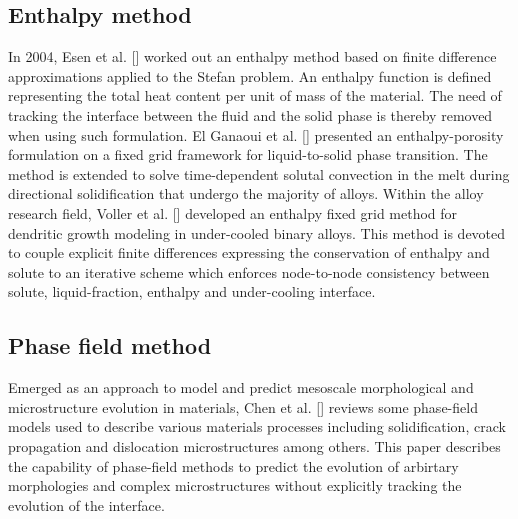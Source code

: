 \subsection{Enthalpy method}
In 2004, Esen et al. [\cite{esen_kutluay_2004}] worked out an enthalpy method based on finite difference approximations applied to the Stefan problem. An enthalpy function is defined representing the total heat content per unit of mass of the material. The need of tracking the interface between the fluid and the solid phase is thereby removed when using such formulation. El Ganaoui et al. [\cite{el ganaoui_lamazouade_bontoux_morvan_2002}] presented an enthalpy-porosity formulation on a fixed grid framework for liquid-to-solid phase transition. The method is extended to solve time-dependent solutal convection in the melt during directional solidification that undergo the majority of alloys. Within the alloy research field, Voller et al. [\cite{voller_2008}] developed an enthalpy fixed grid method for dendritic growth modeling in under-cooled binary alloys. This method is devoted to couple explicit finite differences expressing the conservation of enthalpy and solute to an iterative scheme which enforces node-to-node consistency between solute, liquid-fraction, enthalpy and under-cooling interface.
\subsection{Phase field method}
Emerged as an approach to model and predict mesoscale morphological and microstructure evolution in materials, Chen et al. [\cite{chen_2002}] reviews some phase-field models used to describe various materials processes including solidification, crack propagation and dislocation microstructures among others. This paper describes the capability of phase-field methods to predict the evolution of arbirtary morphologies and complex microstructures without explicitly tracking the evolution of the interface.
